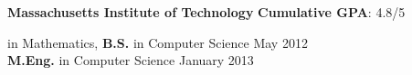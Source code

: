 \documentclass[11 pt]{article}
\begin{document}
\noindent \textbf{Massachusetts Institute of Technology} \hfill \textbf{Cumulative GPA}: 4.8/5 \\
\begin{small}
 in Mathematics, {\bf B.S.} in Computer Science \hfill May 2012 \\
{\bf M.Eng.} in Computer Science \hfill January 2013 \\
\end{small}

\vspace{8 pt}

\begin{comment}
\begin{small}

 \noindent \textbf{Relevant Technical Coursework:}

\textbf{Physics}:
Physics III (Vibrations and Waves); Classical Mechanics II

 \textbf{Economics}:
 Microeconomics; %
 Networks;
 Robust Mechanism Design;
Game Theory %
Public Finance and Public Policy

 \textbf{Math}:
 \noindent Real Analysis; %
 Linear Algebra and Group Theory; %
 Differential Forms; %
 Combinatorial Analysis;
 Probability and Random Variables;
 Differential Equations;
 Seminar in Logic

\textbf{CS Theory}:
 Networks;
 Design and Analysis of Algorithms; %
 Approximation Algorithms;
 Sub-Linear Algorithms;
 Complexity Theory I and II; %
 Advanced Complexity Theory;
 Quantum Complexity Theory;
 Combinatorial Optimization;
 Cryptography I and II; %
 Modern Developments in Cryptography
 Artificial Intelligence;

 \textbf{CS Systems}:
Intro to EECS I and II;
 Computer Systems Engineering;
 Elements of Software Construction;
 Computation Structures;
 Performance Engineering of Software Systems
 \end{small} \\
\end{comment}
\end{document}
